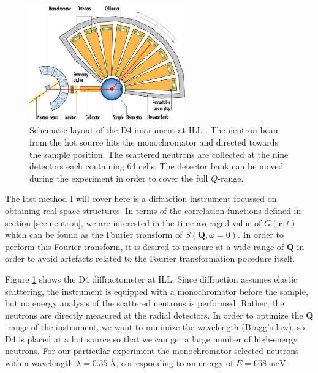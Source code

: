 \begin{figure}
	\centering
	\includegraphics[width=0.6\textwidth]{fig/method/ns/d4.jpg}
	\caption[D4 layout]{Schematic layout of the D4 instrument at ILL \cite{d4}. The neutron beam from the hot source hits the monochromator and directed towards the sample position. The scattered neutrons are collected at the nine detectors each containing 64 cells. The detector bank can be moved during the experiment in order to cover the full $Q$-range.}
	\label{fig:d4}
\end{figure}

The last method I will cover here is a diffraction instrument focussed on obtaining real space structures. In terms of the correlation functions defined in section \ref{sec:neutron}, we are interested in the time-averaged value of $G(\bm{r}, t)$ which can be found as the Fourier transform of $S(\bm{Q},\omega=0)$. In order to perform this Fourier transform, it is desired to measure at a wide range of $\bm{Q}$ in order to avoid artefacts related to the Fourier transformation pocedure itself.

Figure \ref{fig:d4} shows the D4 diffractometer at ILL. Since diffraction assumes elastic scattering, the instrument is equipped with a monochromator before the sample, but no energy analysis of the scattered neutrons is performed. Rather, the neutrons are directly measured at the radial detectors. In order to optimize the $\bm{Q}$-range of the instrument, we want to minimize the wavelength (Bragg's law), so D4 is placed at a hot source so that we can get a large number of high-energy neutrons. For our particular experiment the monochromator selected neutrons with a wavelength $\lambda = \SI{0.35}{\angstrom}$, corresponding to an energy of $E = \SI{668}{\milli\eV}$.

